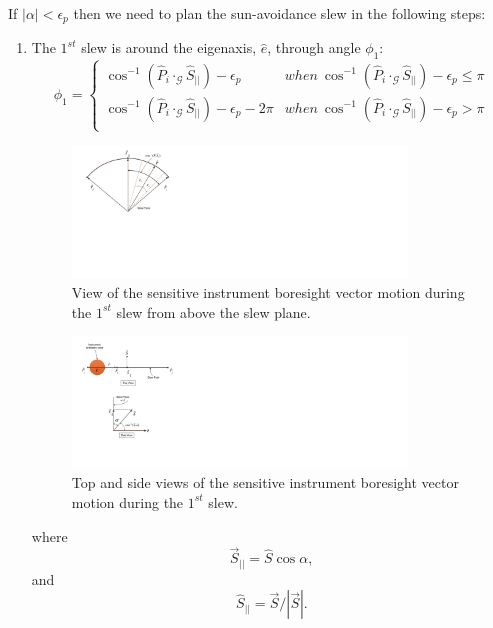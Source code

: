 \documentclass[letterpaper, paper,12pt]{AAS}		%
\begin{document}
	If $|\alpha|<\epsilon_p$ then we need to plan the sun-avoidance slew in the following steps: 
	\begin{enumerate}
		\item The $1^{st}$ slew is around the eigenaxis, $\hat{e}$, through angle $\phi_1$:
		\begin{equation}\label{phi1_1}
		\phi_1=\left\{
		\begin{array}{ll}
		\cos^{-1}(\hat{P}_i\cdot_\mathcal{G}\hat{S}_{||})-\epsilon_p& when\  \cos^{-1}(\hat{P}_i\cdot_\mathcal{G}\hat{S}_{||})-\epsilon_p\leq \pi\\
		\cos^{-1}(\hat{P}_i\cdot_\mathcal{G}\hat{S}_{||})-\epsilon_p-2\pi& when\ \cos^{-1}(\hat{P}_i\cdot_\mathcal{G}\hat{S}_{||})-\epsilon_p>\pi\\
		\end{array}
		\right.
		\end{equation}
		\begin{figure}[H]
			\begin{center}
				\includegraphics[width=3.5in]{./Figures/SVAS_1r_modified}
				\caption{View of the sensitive instrument boresight vector motion during the $1^{st}$ slew from above the slew plane.}
			\end{center}
		\end{figure}
		\begin{figure}[H]
			\begin{center}
				\includegraphics[width=3.5in]{./Figures/SVAS_1rb_modified}
				\caption{Top and side views of the sensitive instrument boresight vector motion during the $1^{st}$ slew.}
			\end{center}
		\end{figure}
		where 
		\begin{equation}\label{Sbar}
		\vec{S}_{||}=\hat{S}\cos\alpha, 
		\end{equation}
		and
		\begin{equation}\label{Shat}
		\hat{S}_{||}=\vec{S}/|\vec{S}|.
		\end{equation}
	

\end{enumerate}
\end{document}
